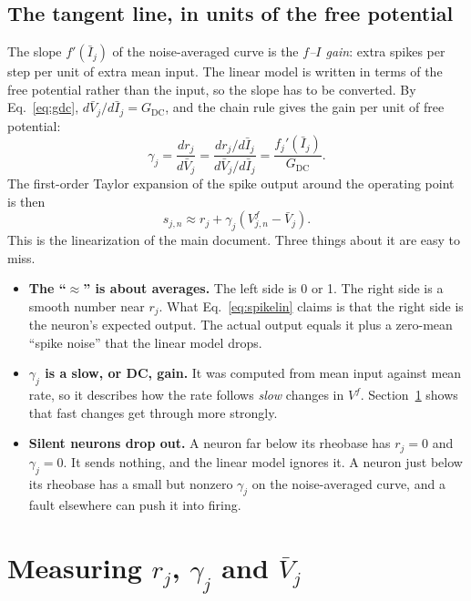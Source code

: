 \documentclass[11pt,a4paper]{article}
\newcommand{\GDC}{G_{\mathrm{DC}}}
\begin{document}
\subsection{The tangent line, in units of the free potential}

The slope $f'(\bar I_j)$ of the noise-averaged curve is the \emph{$f$--$I$ gain}: extra spikes per step per unit of extra mean input. The linear model is written in terms of the free potential rather than the input, so the slope has to be converted. By Eq.~\eqref{eq:gdc}, $d\bar V_j / d\bar I_j = \GDC$, and the chain rule gives the gain per unit of free potential:
\begin{equation}
\gamma_j = \frac{dr_j}{d\bar V_j} = \frac{dr_j/d\bar I_j}{d\bar V_j/d\bar I_j} = \frac{f_j'(\bar I_j)}{\GDC}.
\label{eq:gamma}
\end{equation}
The first-order Taylor expansion of the spike output around the operating point is then
\begin{equation}
s_{j,n} \approx r_j + \gamma_j \left( V^f_{j,n} - \bar V_j \right).
\label{eq:spikelin}
\end{equation}
This is the linearization of the main document. Three things about it are easy to miss.

\begin{itemize}
  \item \textbf{The ``$\approx$'' is about averages.} The left side is 0 or 1. The right side is a smooth number near $r_j$. What Eq.~\eqref{eq:spikelin} claims is that the right side is the neuron's expected output. The actual output equals it plus a zero-mean ``spike noise'' that the linear model drops.
  \item \textbf{$\gamma_j$ is a slow, or DC, gain.} It was computed from mean input against mean rate, so it describes how the rate follows \emph{slow} changes in $V^f$. Section~\ref{sec:measure} shows that fast changes get through more strongly.
  \item \textbf{Silent neurons drop out.} A neuron far below its rheobase has $r_j = 0$ and $\gamma_j = 0$. It sends nothing, and the linear model ignores it. A neuron just below its rheobase has a small but nonzero $\gamma_j$ on the noise-averaged curve, and a fault elsewhere can push it into firing.
\end{itemize}

\section{Measuring \texorpdfstring{$r_j$, $\gamma_j$ and $\bar V_j$}{the operating point}}
\label{sec:measure}
\end{document}
